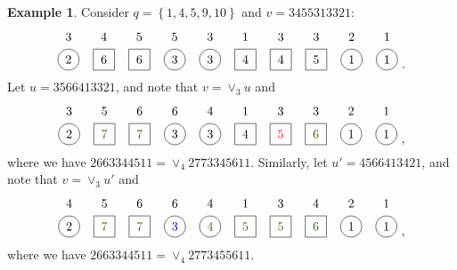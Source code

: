 \documentclass[reqno]{amsart}
\newcommand{\0}{\phantom{c}}
\newcommand{\merge}[1]{\vee_{#1}} %
\newcommand{\set}[1]{\left\{ #1 \right\}}
\theoremstyle{plain}
\theoremstyle{definition}
\newtheorem{example}[thm]{Example}
\numberwithin{equation}{section}
\begin{document}
\begin{example}
Consider $q = \set{1,4,5,9,10}$ and $v = 3455313321$:
\[
\begin{tikzpicture}[baseline=-7]
  \def\ll{0.65}   %
  \foreach \i in {6,10} { \node at (\i,\ll) {$1$}; }
  \foreach \i in {9} { \node at (\i,\ll) {$2$}; }
  \foreach \i in {1,5,7,8} { \node at (\i,\ll) {$3$}; }
  \foreach \i in {2} { \node at (\i,\ll) {$4$}; }
  \foreach \i in {3,4} { \node at (\i,\ll) {$5$}; }
  \foreach \i in {1,4,5,9,10} { \draw (\i,0) circle (0.3); }
  \foreach \i in {2,3,6,7,8} { \draw (\i-.3,0-.3) rectangle +(0.6,+0.6); }
  \foreach \i in {9,10} { \node at (\i,0) {$1$}; }
  \foreach \i in {1} { \node at (\i,0) {$2$}; }
  \foreach \i in {4,5} { \node at (\i,0) {$3$}; }
  \foreach \i in {6,7} { \node at (\i,0) {$4$}; }
  \foreach \i in {8} { \node at (\i,0) {$5$}; }
  \foreach \i in {2,3} { \node at (\i,0) {$6$}; }
\end{tikzpicture}\ .
\]
Let $u = 3566413321$, and note that $v = \merge{3} u$ and
\[
\begin{tikzpicture}[baseline=-7]
  \def\ll{0.65}   %
  \foreach \i in {6,10} { \node at (\i,\ll) {$1$}; }
  \foreach \i in {9} { \node at (\i,\ll) {$2$}; }
  \foreach \i in {1,7,8} { \node at (\i,\ll) {$3$}; }
  \foreach \i in {5} { \node at (\i,\ll) {$4$}; }
  \foreach \i in {2} { \node at (\i,\ll) {$5$}; }
  \foreach \i in {3,4} { \node at (\i,\ll) {$6$}; }
  \foreach \i in {1,4,5,9,10} { \draw (\i,0) circle (0.3); }
  \foreach \i in {2,3,6,7,8} { \draw (\i-.3,0-.3) rectangle +(0.6,+0.6); }
  \foreach \i in {9,10} { \node at (\i,0) {$1$}; }
  \foreach \i in {1} { \node at (\i,0) {$2$}; }
  \foreach \i in {4,5} { \node at (\i,0) {$3$}; }
  \foreach \i in {6} { \node at (\i,0) {$4$}; }
  \foreach \i in {7} { \node[red] at (\i,0) {$5$}; }
  \foreach \i in {8} { \node[dgreencolor] at (\i,0) {$6$}; }
  \foreach \i in {2,3} { \node[dgreencolor] at (\i,0) {$7$}; }
\end{tikzpicture}\ ,
\]
where we have $2663344511 = \merge{4} 2773345611$.
Similarly, let $u' = 4566413421$, and note that $v = \merge{3} u'$ and
\[
\begin{tikzpicture}[baseline=-7]
  \def\ll{0.65}   %
  \foreach \i in {6,10} { \node at (\i,\ll) {$1$}; }
  \foreach \i in {9} { \node at (\i,\ll) {$2$}; }
  \foreach \i in {7} { \node at (\i,\ll) {$3$}; }
  \foreach \i in {1,5,8} { \node at (\i,\ll) {$4$}; }
  \foreach \i in {2} { \node at (\i,\ll) {$5$}; }
  \foreach \i in {3,4} { \node at (\i,\ll) {$6$}; }
  \foreach \i in {1,4,5,9,10} { \draw (\i,0) circle (0.3); }
  \foreach \i in {2,3,6,7,8} { \draw (\i-.3,0-.3) rectangle +(0.6,+0.6); }
  \foreach \i in {9,10} { \node at (\i,0) {$1$}; }
  \foreach \i in {1} { \node at (\i,0) {$2$}; }
  \foreach \i in {4} { \node[blue] at (\i,0) {$3$}; }
  \foreach \i in {5} { \node[dgreencolor] at (\i,0) {$4$}; }
  \foreach \i in {6,7} { \node[dgreencolor] at (\i,0) {$5$}; }
  \foreach \i in {8} { \node[dgreencolor] at (\i,0) {$6$}; }
  \foreach \i in {2,3} { \node[dgreencolor] at (\i,0) {$7$}; }
\end{tikzpicture}\ ,
\]
where we have $2663344511 = \merge{4} 2773455611$.
\end{example}
\end{document}
